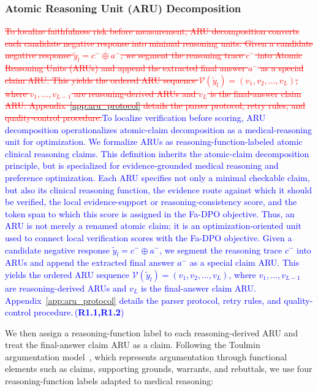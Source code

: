 \documentclass[a4paper,fleqn,doubleblind]{cas-sc}
\DeclareRobustCommand{\deleted}[1]{\textcolor{red}{\sout{#1}}}
\DeclareRobustCommand{\added}[1]{\textcolor{blue}{#1}}
\DeclareRobustCommand{\revtag}[1]{\textcolor{blue}{\scriptsize\,(\textbf{#1})}}
\begin{document}
\subsubsection{Atomic Reasoning Unit (ARU) Decomposition}
\label{sec:decomposition}
\deleted{To localize faithfulness risk before measurement, ARU decomposition converts each candidate negative response into minimal reasoning units. Given a candidate negative response $\tilde{y}_l = c^{-} \oplus a^{-}$, we segment the reasoning trace $c^{-}$ into Atomic Reasoning Units (ARUs) and append the extracted final answer $a^{-}$ as a special claim ARU. This yields the ordered ARU sequence $\mathcal{V}(\tilde{y}_l) = (v_1, v_2, \dots, v_L)$, where $v_1, \dots, v_{L-1}$ are reasoning-derived ARUs and $v_L$ is the final-answer claim ARU. Appendix~\ref{app:aru_protocol} details the parser protocol, retry rules, and quality-control procedure.}\added{To localize verification before scoring, ARU decomposition operationalizes atomic-claim decomposition as a medical-reasoning unit for optimization. We formalize ARUs as reasoning-function-labeled atomic clinical reasoning claims. This definition inherits the atomic-claim decomposition principle, but is specialized for evidence-grounded medical reasoning and preference optimization. Each ARU specifies not only a minimal checkable claim, but also its clinical reasoning function, the evidence route against which it should be verified, the local evidence-support or reasoning-consistency score, and the token span to which this score is assigned in the Fa-DPO objective. Thus, an ARU is not merely a renamed atomic claim; it is an optimization-oriented unit used to connect local verification scores with the Fa-DPO objective. Given a candidate negative response $\tilde{y}_l = c^{-} \oplus a^{-}$, we segment the reasoning trace $c^{-}$ into ARUs and append the extracted final answer $a^{-}$ as a special claim ARU. This yields the ordered ARU sequence $\mathcal{V}(\tilde{y}_l) = (v_1, v_2, \dots, v_L)$, where $v_1, \dots, v_{L-1}$ are reasoning-derived ARUs and $v_L$ is the final-answer claim ARU. Appendix~\ref{app:aru_protocol} details the parser protocol, retry rules, and quality-control procedure.}\revtag{R1.1,R1.2}

We then assign a reasoning-function label to each reasoning-derived ARU and treat the final-answer claim ARU as a claim. Following the Toulmin argumentation model~\cite{toulmin1958uses}, which represents argumentation through functional elements such as claims, supporting grounds, warrants, and rebuttals, we use four reasoning-function labels adapted to medical reasoning:
\end{document}
